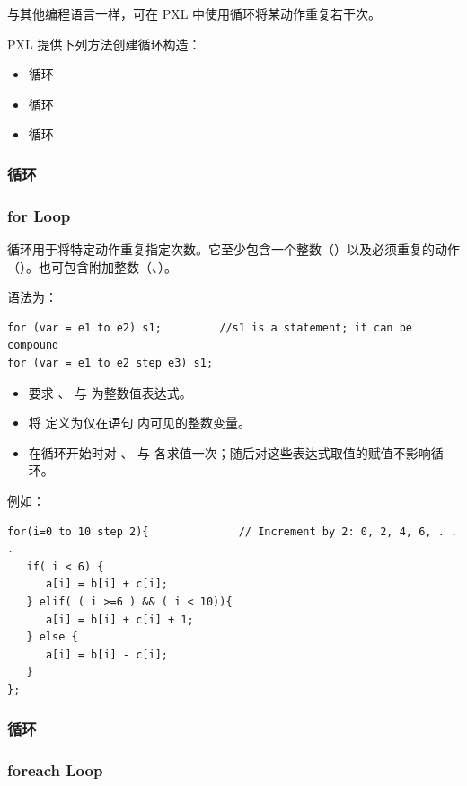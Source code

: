 与其他编程语言一样，可在 PXL 中使用循环将某动作重复若干次。

PXL 提供下列方法创建循环构造：
\begin{itemize}
  \item {} 循环
  \item {} 循环
  \item {} 循环
\end{itemize}

\subsubsection{ 循环}
\subsubsection*{for Loop}

 循环用于将特定动作重复指定次数。它至少包含一个整数（）以及必须重复的动作（）。也可包含附加整数（、）。

语法为：
\begin{lstlisting}[style=pxl]
for (var = e1 to e2) s1;         //s1 is a statement; it can be compound
for (var = e1 to e2 step e3) s1;
\end{lstlisting}

\begin{itemize}
  \item 要求 、 与  为整数值表达式。
  \item 将  定义为仅在语句  内可见的整数变量。
  \item 在循环开始时对 、 与  各求值一次；随后对这些表达式取值的赋值不影响循环。
\end{itemize}

例如：
\begin{lstlisting}[style=pxl]
for(i=0 to 10 step 2){              // Increment by 2: 0, 2, 4, 6, . . .
   if( i < 6) {
      a[i] = b[i] + c[i];
   } elif( ( i >=6 ) && ( i < 10)){
      a[i] = b[i] + c[i] + 1;
   } else {
      a[i] = b[i] - c[i];
   }
};
\end{lstlisting}

\subsubsection{ 循环}
\subsubsection*{foreach Loop}

